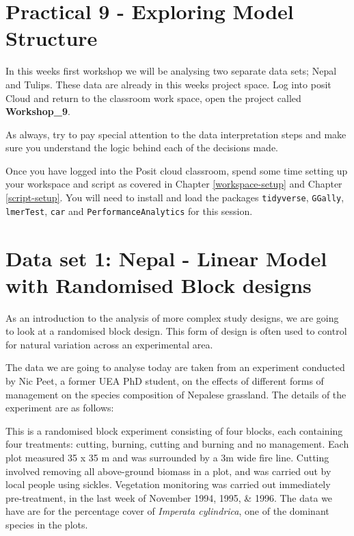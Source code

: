 \documentclass[
]{book}
\begin{document}
\section{Practical 9 - Exploring Model Structure}\label{practical-9---exploring-model-structure}

In this weeks first workshop we will be analysing two separate data sets; Nepal and Tulips. These data are already in this weeks project space. Log into posit Cloud and return to the classroom work space, open the project called \textbf{Workshop\_9}.

As always, try to pay special attention to the data interpretation steps and make sure you understand the logic behind each of the decisions made.

Once you have logged into the Posit cloud classroom, spend some time setting up your workspace and script as covered in Chapter \ref{workspace-setup} and Chapter \ref{script-setup}. You will need to install and load the packages \texttt{tidyverse}, \texttt{GGally}, \texttt{lmerTest}, \texttt{car} and \texttt{PerformanceAnalytics} for this session.

\section{Data set 1: Nepal - Linear Model with Randomised Block designs}\label{data-set-1-nepal---linear-model-with-randomised-block-designs}

As an introduction to the analysis of more complex study designs, we are going to look at a randomised block design. This form of design is often used to control for natural variation across an experimental area.

The data we are going to analyse today are taken from an experiment conducted by Nic Peet, a former UEA PhD student, on the effects of different forms of management on the species composition of Nepalese grassland. The details of the experiment are as follows:

This is a randomised block experiment consisting of four blocks, each containing four treatments: cutting, burning, cutting and burning and no management. Each plot measured 35 x 35 m and was surrounded by a 3m wide fire line. Cutting involved removing all above-ground biomass in a plot, and was carried out by local people using sickles. Vegetation monitoring was carried out immediately pre-treatment, in the last week of November 1994, 1995, \& 1996. The data we have are for the percentage cover of \emph{Imperata cylindrica}, one of the dominant species in the plots.
\end{document}
